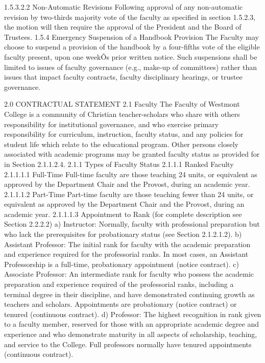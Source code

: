\documentclass[letterpaper, 11pt]{article}
\begin{document}
1.5.3.2.2 Non-Automatic Revisions
Following approval of any non-automatic revision by two-thirds majority vote of the faculty as specified in section 1.5.2.3, the motion will then require the approval of the President and the Board of Trustees.
1.5.4 Emergency Suspension of a Handbook Provision
   The Faculty may choose to suspend a provision of the handbook by a four-fifths vote of the eligible faculty present, upon one weekÕs prior written notice.  Such suspensions shall be limited to issues of faculty governance (e.g., make-up of committees) rather than issues that impact faculty contracts, faculty disciplinary hearings, or trustee governance.
   
2.0 CONTRACTUAL STATEMENT
2.1 Faculty
   The Faculty of Westmont College is a community of Christian teacher-scholars who share with others responsibility for institutional governance, and who exercise primary responsibility for curriculum, instruction, faculty status, and any policies for student life which relate to the educational program.  Other persons closely associated with academic programs may be granted faculty status as provided for in Section 2.1.1.2.4.
2.1.1 Types of Faculty Status
2.1.1.1 Ranked Faculty
2.1.1.1.1 Full-Time
   Full-time faculty are those teaching 24 units, or equivalent as approved by the Department Chair and the Provost, during an academic year.
2.1.1.1.2 Part-Time
   Part-time faculty are those teaching fewer than 24 units, or equivalent as approved by the Department Chair and the Provost, during an academic year.
2.1.1.1.3 Appointment to Rank
	(for complete description see Section 2.2.2.2)
a) Instructor:  Normally, faculty with professional preparation but who lack the prerequisites for probationary status (see Section 2.1.2.1.2).
b) Assistant Professor:  The initial rank for faculty with the academic preparation and experience required for the professorial ranks. In most cases, an Assistant Professorship is a full-time, probationary appointment (notice contract).
c) Associate Professor:  An intermediate rank for faculty who possess the academic preparation and experience required of the professorial ranks, including a terminal degree in their discipline, and have demonstrated continuing growth as teachers and scholars. Appointments are probationary (notice contract) or tenured (continuous contract).
d) Professor:  The highest recognition in rank given to a faculty member, reserved for those with an appropriate academic degree and experience and who demonstrate maturity in all aspects of scholarship, teaching, and service to the College. Full professors normally have tenured appointments (continuous contract).
\end{document}

